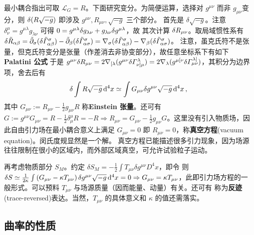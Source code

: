 最小耦合指出可取 $\mathcal L_G=R$。下面研究变分。为简便运算，选择对 $g^{\mu\nu}$ 而非 $g_{\mu\nu}$变分，则 $\var(R\sqrt{-g})$ 即涉及 $g^{\mu\nu},R_{\mu\nu},\sqrt{-g}$ 三个部分。
首先是 $\delta\sqrt{-g}$。注意 $\delta^{\mu}_{\nu}=g^{\mu\lambda}g_{\lambda\nu}$ 可得 $0=g^{\mu\lambda}\var g_{\lambda\nu}+g_{\lambda\nu}\var g^{\mu\lambda}$，故
其次计算 $\var R_{\mu\nu}$。取局域惯性系有 $\delta\tilde R_{\alpha\beta} = \tilde{\partial}_\sigma(\delta\tilde\Gamma^\sigma_{\alpha\beta})-\tilde{\partial}_\beta(\delta\tilde \Gamma^\sigma_{\alpha\sigma}) = \nabla_\sigma(\delta\tilde\Gamma^\sigma_{\alpha\beta})-\nabla_\beta(\delta\tilde \Gamma^\sigma_{\alpha\sigma})$。
注意，虽克氏符不是张量，但克氏符变分是张量（作差消去非协变部分），故任意坐标系下有如下\textbf{Palatini 公式}
于是 $g^{\mu\nu}\var R_{\mu\nu}=2 \nabla_{[\lambda}( g^{\mu\nu} \delta \Gamma_{\nu]\mu}^\lambda) =2\nabla_\lambda(g^{\mu [\nu} \delta \Gamma_{\mu \nu}^{\lambda]})$，其积分为边界项，舍去后有
\[\var \int R\sqrt{-g}\dd[4]{x} 
\simeq\int G_{\mu\nu} \var g^{\mu\nu} \sqrt{-g}\dd[4]{x},\]
其中 $G_{\mu\nu}:=R_{\mu\nu}-\frac 12 g_{\mu\nu} R$ 称\textbf{Einstein 张量}。还可有 $G:=g^{\mu\nu}G_{\mu\nu}=R-\frac{1}{2}\delta^\mu_\mu R=-R\Rightarrow R_{\mu\nu}=G_{\mu\nu}-\frac 12 g_{\mu\nu} G$。这里没有引入物质场，因此自由引力场在最小耦合意义上满足 $G_{\mu\nu}=0$ 即 $R_{\mu\nu}=0$，称\textbf{真空方程}(vacuum equation)。闵氏度规显然是一个解。
真空方程已能描述很多引力现象，因为场源往往限制在很小的区域内，而外部区域真空，可允许试验粒子运动。

再考虑物质部分 $S_M$。约定 $\delta S_M =-\frac{1}{2} \int T_{\mu \nu} \delta g^{\mu \nu} D^4{x}$，即令
则 $\var S\simeq\frac{1}{2\kappa}\int\left(G_{\mu\nu}-\kappa T_{\mu\nu}\right)\var g^{\mu\nu}\sqrt{-g}\dd[4]{x}=0\Rightarrow G_{\mu\nu}=\kappa T_{\mu\nu}$，此即引力场方程的一般形式。可以预料 $T_{\mu\nu}$ 与场源质量（因而能量、动量）有关。还可有
称为\textbf{反迹}(trace-reversed)表达。当然，$T_{\mu\nu}$ 的具体意义和 $\kappa$ 的值还需落实。

\subsection{曲率的性质}

